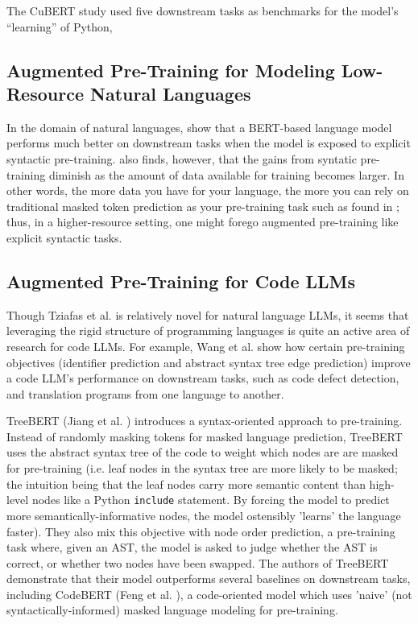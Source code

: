 \documentclass[acmlarge]{acmart}
\begin{document}
The CuBERT study used five downstream tasks as benchmarks for the model's ``learning'' of Python, 

\subsection{Augmented Pre-Training for Modeling Low-Resource Natural Languages}

In the domain of natural languages, \cite{Tziafas} show that a BERT-based \cite{BERT} language model performs much better on downstream tasks when the model is exposed to explicit syntactic pre-training. \cite{Tziafas} also finds, however, that the gains from syntatic pre-training diminish as the amount of data available for training becomes larger. In other words, the more data you have for your language, the more you can rely on traditional masked token prediction as your pre-training task such as found in \cite{BERT}; thus, in a higher-resource setting, one might forego augmented pre-training like explicit syntactic tasks.

\subsection{Augmented Pre-Training for Code LLMs}\label{code-llms}

Though Tziafas et al. \cite{Tziafas} is relatively novel for natural language LLMs, it seems that leveraging the rigid structure of programming languages is quite an active area of research for code LLMs. For example, Wang et al. \cite{wang-contrastive-learning} show how certain pre-training objectives (identifier prediction and abstract syntax tree edge prediction) improve a code LLM's performance on downstream tasks, such as code defect detection, and translation programs from one language to another.

TreeBERT (Jiang et al. \cite{TreeBERT}) introduces a syntax-oriented approach to pre-training. Instead of randomly masking tokens for masked language prediction, TreeBERT uses the abstract syntax tree of the code to weight which nodes are are masked for pre-training (i.e. leaf nodes in the syntax tree are more likely to be masked; the intuition being that the leaf nodes carry more semantic content than high-level nodes like a Python \texttt{include} statement. By forcing the model to predict more semantically-informative nodes, the model ostensibly 'learns' the language faster). They also mix this objective with node order prediction, a pre-training task where, given an AST, the model is asked to judge whether the AST is correct, or whether two nodes have been swapped. The authors of TreeBERT demonstrate that their model outperforms several baselines on downstream tasks, including CodeBERT (Feng et al. \cite{CodeBERT}), a code-oriented model which uses 'naive' (not syntactically-informed) masked language modeling for pre-training.
\end{document}
